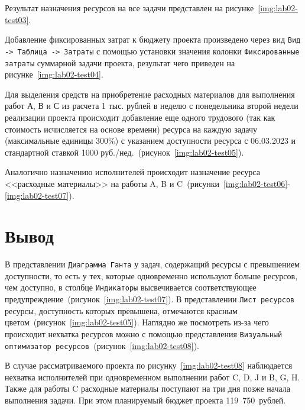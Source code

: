 Результат назначения ресурсов на все задачи представлен на
рисунке~\ref{img:lab02-test03}.


Добавление фиксированных затрат к бюджету проекта произведено через вид
\texttt{Вид -> Таблица -> Затраты} с помощью установки значения колонки
\texttt{Фиксированные затраты} суммарной задачи проекта, результат чего
приведен на рисунке~\ref{img:lab02-test04}.


Для выделения средств на приобретение расходных материалов для выполнения работ
А, В и С из расчета 1 тыс. рублей в неделю с понедельника второй недели
реализации проекта происходит добавление еще одного трудового (так как
стоимость исчисляется на основе времени) ресурса на каждую задачу (максимальные
единицы 300\%) с указанием доступности ресурса с 06.03.2023 и стандартной
ставкой 1000 руб./нед.~(рисунок~\ref{img:lab02-test05}).


Аналогично назначению исполнителей происходит назначение ресурса <<расходные
материалы>> на работы A, B и
C~(рисунки~\ref{img:lab02-test06}-\ref{img:lab02-test07}).



\vspace{-0.5cm}
\section*{Вывод}

В представлении \texttt{Диаграмма Ганта} у задач, содержащий ресурсы с
превышением доступности, то есть у тех, которые одновременно используют больше
ресурсов, чем доступно, в столбце \texttt{Индикаторы} высвечивается
соответствующее предупреждение~(рисунок~\ref{img:lab02-test07}). В представлении
\texttt{Лист ресурсов} ресурсы, доступность которых превышена, отмечаются
красным цветом~(рисунок~\ref{img:lab02-test05}). Наглядно же посмотреть из-за
чего происходит нехватка ресурсов можно с помощью представления
\texttt{Визуальный оптимизатор ресурсов}~(рисунок~\ref{img:lab02-test08}). 


В случае рассматриваемого проекта по рисунку~\ref{img:lab02-test08} наблюдается
нехватка исполнителей при одновременном выполнении работ C, D, J и B, G, H.
Также для работы C расходные материалы поступают на три дня позже начала
выполнения задачи. При этом планируемый бюджет проекта 119~750~рублей.
